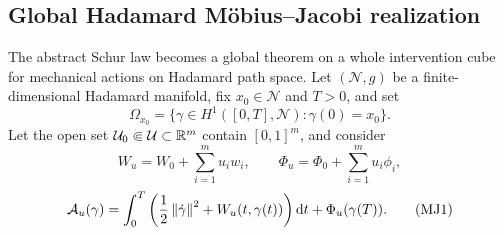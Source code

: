 \subsection{Global Hadamard M\"obius--Jacobi realization}

The abstract Schur law becomes a global theorem on a whole intervention cube
for mechanical actions on Hadamard path space.  Let \((\mathcal N,g)\) be a
finite-dimensional Hadamard manifold, fix \(x_0\in\mathcal N\) and \(T>0\),
and set
\[
  \Omega_{x_0}
  =\{\gamma\in H^1([0,T],\mathcal N):\gamma(0)=x_0\}.
\]
Let the open set \(\mathcal U_0\Subset\mathcal U\subset\mathbb R^m\) contain
\([0,1]^m\), and
consider
\[
  W_u=W_0+\sum_{i=1}^m u_iw_i,
  \qquad
  \Phi_u=\Phi_0+\sum_{i=1}^m u_i\phi_i,
\]
\begin{equation}
  \mathcal A_u(\gamma)
  =\int_0^T
  \left(\frac12\left\lVert \dot\gamma\right\rVert^2+W_u(t,\gamma(t))\right)\mathrm d t
  +\Phi_u(\gamma(T)).
  \tag{MJ1}
\end{equation}

